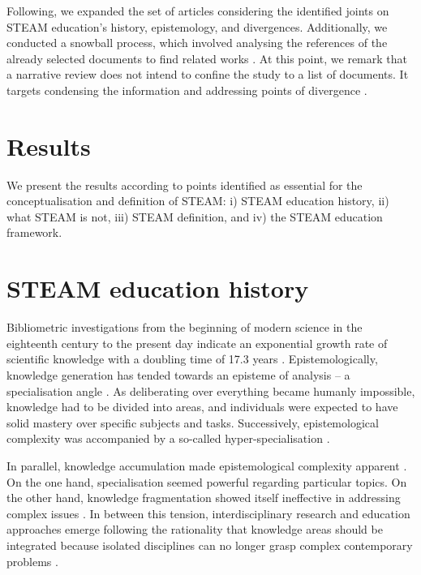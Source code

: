 \documentclass[english]{textolivre}
\begin{document}
Following, we expanded the set of articles considering the identified joints on STEAM education’s history, epistemology, and divergences. Additionally, we conducted a snowball process, which involved analysing the references of the already selected documents to find related works \cite{green_writing_2006}. At this point, we remark that a narrative review does not intend to confine the study to a list of documents. It targets condensing the information and addressing points of divergence \cite{green_writing_2006}.


\section{Results}

We present the results according to points identified as essential for the conceptualisation and definition of STEAM: i) STEAM education history, ii) what STEAM is not, iii) STEAM definition, and iv) the STEAM education framework.


\section{STEAM education history}

Bibliometric investigations from the beginning of modern science in the eighteenth century to the present day indicate an exponential growth rate of scientific knowledge with a doubling time of 17.3 years \cite{bornmann_growth_2021}. Epistemologically, knowledge generation has tended towards an episteme of analysis – a specialisation angle \cite{florentino_disciplinaridade_2015}. As deliberating over everything became humanly impossible, knowledge had to be divided into areas, and individuals were expected to have solid mastery over specific subjects and tasks. Successively, epistemological complexity was accompanied by a so-called hyper-specialisation \cite{malone2011age}.

In parallel, knowledge accumulation made epistemological complexity apparent \cite{florentino_disciplinaridade_2015}. On the one hand, specialisation seemed powerful regarding particular topics. On the other hand, knowledge fragmentation showed itself ineffective in addressing complex issues \cite{danermark_applied_2019}. In between this tension, interdisciplinary research and education approaches emerge following the rationality that knowledge areas should be integrated because isolated disciplines can no longer grasp complex contemporary problems \cite{florentino_disciplinaridade_2015, unesco1997}.
\end{document}
